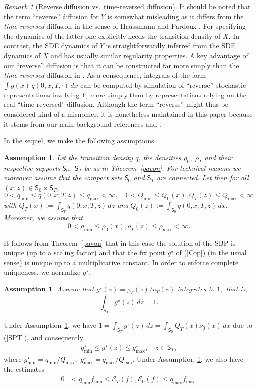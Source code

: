 \documentclass[a4paper,11pt]{amsart}
\theoremstyle{plain}
\newtheorem{assump}[theorem]{Assumption}
\theoremstyle{remark}
\newtheorem{remark}[theorem]{Remark}
\begin{document}
\begin{remark}[Reverse diffusion vs.\ time-reversed diffusion]
It should be noted that the term ``reverse'' diffusion for $Y$ is somewhat misleading as it  
differs from the \emph{time-reversed} diffusion 
in the sense of Haussmann and Pardoux \cite{HP86}. For specifying the dynamics of the latter one explicitly needs the transition
density of $X$.  In contrast, the SDE dynamics of $Y$  is  straightforwardly inferred from the SDE dynamics of $X$ and  has usually similar regularity properties.  A key advantage of our ``reverse'' diffusion is that it can be constructed far more simply than the \emph{time-reversed} diffusion 
 in \cite{HP86}. As a consequence,
integrals of the form $\int g(x)\,q(0,x,T,\cdot)\,dx$ can be 
computed by simulation of ``reverse'' stochastic representations  
involving $Y$, more simply than by representations relying on the real 
``time-reversed'' diffusion.
%
Although the term ``reverse''  might thus be considered kind of a misnomer, it is  nonetheless  maintained  in this paper because it stems from our main
background references \cite{BS2014} and \cite{MSS2004}.    
\end{remark}
In the sequel, we make the following assumptions. 
\begin{assump} 
\label{ass:qrho}
Let the transition density $q$, the densities $\rho_0,$ $\rho_T$ and their respective  supports $\mathsf{S}_0,$ $\mathsf{S}_T$ be as in Theorem~\ref{pavon}. For technical reasons  we moreover assume that the compact sets
$\mathsf{S}_0$ and $\mathsf{S}_T$ are {\em connected}.
Let then for all \((x,z)\in \mathsf{S}_{0}\times \mathsf{S}_{T},\)
\[
0<q_{\min}\leq q(0,x;T,z) \leq q_{\max}<\infty,\quad
0<Q_{\min}\leq Q_0(x), Q_T(z)\leq Q_{\max}<\infty 
\]
with $Q_T(x):=\int_{\mathsf{S}_{T}} q(0,x;T,z)\,dz$ and $Q_0(z):=\int_{\mathsf{S}_{0}} q(0,x;T,z)\,dx.$
Moreover, we assume that
\[
0<\rho_{\min}\leq \rho_0(x),\rho_T(z)\leq \rho_{\max}<\infty.
\]
\end{assump}
It follows from Theorem~\ref{pavon} that in this case the solution of the SBP is unique (up to a scaling factor) and that the fix point  \(g^\star\) of (\ref{Cop}) (in the usual sense) is unique up to a multiplicative constant.
In order to enforce  complete uniqueness, we normalize  \(g^\star\). 
\begin{assump} 
\label{ass:nuT}
Assume that \(g^\star(z)=\rho_T(z)/\nu_T(z)\) integrates to \(1,\) that is,
\[
\int_{\mathsf{S}_{T}}g^\star(z)\,dz=1.
\]
\end{assump}
Under Assumption~\ref{ass:nuT}, we have \(1=\int_{\mathsf{S}_{T}} g^\star(z)\,dz=\int_{\mathsf{S}_{0}}Q_T(x)\nu_{0}(x)\,dx\) due to (\ref{SPT}), and consequently
\begin{eqnarray}
\label{eq:prior-g}
g^\star_{\min}\leq g^\star(z)\leq g^\star_{\max},\quad z\in \mathsf{S}_{T},
\end{eqnarray}
where \(g^\star_{\min}=q_{\min}/Q_{\max},\) \(g^\star_{\max}=q_{\max}/Q_{\min}.\) 
Under Assumption~\ref{ass:qrho},  we  also have the estimates%
\begin{align}
\label{eq:E-bounds}
0  &  <q_{\min}f_{\min}\leq\mathcal{E}_{T}(f),\mathcal{E}_{0}(f)\leq q_{\max} f_{\max}.
\end{align}
\end{document}
